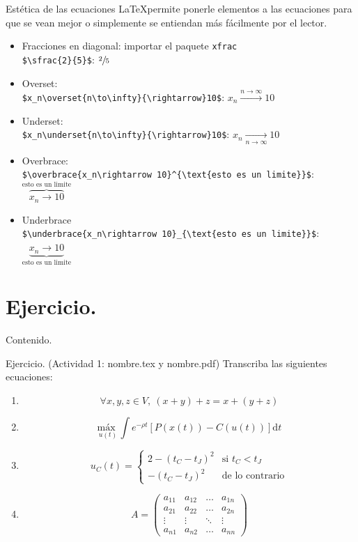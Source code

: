 \documentclass[dvipsnames,xcolor, handout]{beamer}
\theoremstyle{plain}
\theoremstyle{definition}
\begin{document}
\begin{frame}[fragile]{Estética de las ecuaciones}
    \LaTeX permite ponerle elementos a las ecuaciones para que se vean mejor o simplemente se entiendan más fácilmente por el lector.
    \begin{itemize}
        \item Fracciones en diagonal: importar el paquete \verb!xfrac! \\
        \verb!$\sfrac{2}{5}$!: $\sfrac{2}{5}$\pause
        \item Overset: \\
        \verb!$x_n\overset{n\to\infty}{\rightarrow}10$!: $x_n\overset{n\to \infty}{\rightarrow}10$
        \item Underset:\\
        \verb!$x_n\underset{n\to\infty}{\rightarrow}10$!: $x_n\underset{n\to \infty}{\rightarrow}10$\pause
        \item Overbrace:\\
        \small{\verb!$\overbrace{x_n\rightarrow 10}^{\text{esto es un limite}}$!}: $\overbrace{x_n\rightarrow 10}^{\text{esto es un limite}}$
        \item Underbrace\\
        \small{\verb!$\underbrace{x_n\rightarrow 10}_{\text{esto es un limite}}$!}: $\underbrace{x_n\rightarrow 10}_{\text{esto es un limite}}$
    \end{itemize}
\end{frame}

\section{Ejercicio.}
\begin{frame}{Contenido.}
  \tableofcontents[currentsection]
\end{frame}

\begin{frame}{Ejercicio. (Actividad 1: nombre.tex y nombre.pdf)}
Transcriba las siguientes ecuaciones: 
\begin{enumerate}
    \item $$\forall x,y,z \in V,\ (x+y)+z=x+(y+z)$$
    \item $$\underset{u(t)}{\text{máx }}\int\limits e^{-\rho t}\left[P(x(t))-C(u(t))\right]\mathrm{d}t$$
    \item $$u_C(t)=\begin{cases}2-\left(t_C-t_J\right)^2& \text{si } t_C<t_J\\ -\left(t_C-t_J\right)^2 &\text{de lo contrario}\end{cases}$$
    \item $$A=\begin{pmatrix}
    a_{11}&a_{12}&\dots& a_{1n}\\ 
    a_{21}& a_{22}& \dots &a_{2n}\\ 
    \vdots & \vdots & \ddots & \vdots\\
    a_{n1}& a_{n2}& \dots & a_{nn}
    \end{pmatrix}$$
\end{enumerate}

    
\end{frame}
\end{document}
